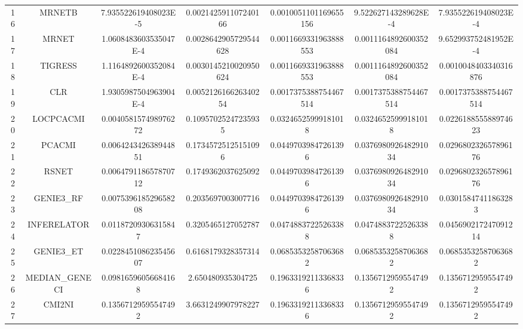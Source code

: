 \documentclass[a4paper,10pt]{article}
\begin{document}
\begin{landscape}
\begin{table}[!htp]
\begin{tabular}{ccccccc}
16&MRNETB&7.935522619408023E-5&0.002142591107240166&0.0010051101169655156&9.522627143289628E-4&7.935522619408023E-4\\
17&MRNET&1.0608483603535047E-4&0.0028642905729544628&0.0011669331963888553&0.0011164892600352084&9.652993752481952E-4\\
18&TIGRESS&1.1164892600352084E-4&0.0030145210020950624&0.0011669331963888553&0.0011164892600352084&0.0010048403340316876\\
19&CLR&1.9305987504963904E-4&0.005212616626340254&0.0017375388754467514&0.0017375388754467514&0.0017375388754467514\\
20&LOCPCACMI&0.004058157498976272&0.10957025247235935&0.03246525999181018&0.03246525999181018&0.022618855588974623\\
21&PCACMI&0.006424342638944851&0.17345725125151096&0.04497039847261396&0.037698092648291034&0.029680232657896176\\
22&RSNET&0.006479118657870712&0.1749362037625092&0.04497039847261396&0.037698092648291034&0.029680232657896176\\
23&GENIE3_RF&0.007539618529658208&0.2035697003007716&0.04497039847261396&0.037698092648291034&0.03015847411863283\\
24&INFERELATOR&0.01187209306315847&0.3205465127052787&0.04748837225263388&0.04748837225263388&0.045690217247091214\\
25&GENIE3_ET&0.022845108623545607&0.6168179328357314&0.06853532587063682&0.06853532587063682&0.06853532587063682\\
26&MEDIAN_GENECI&0.09816596056684168&2.650480935304725&0.19633192113368336&0.13567129595547492&0.13567129595547492\\
27&CMI2NI&0.13567129595547492&3.6631249907978227&0.19633192113368336&0.13567129595547492&0.13567129595547492\\
\hline
\end{tabular}
\end{table}


\end{landscape}
\end{document}
